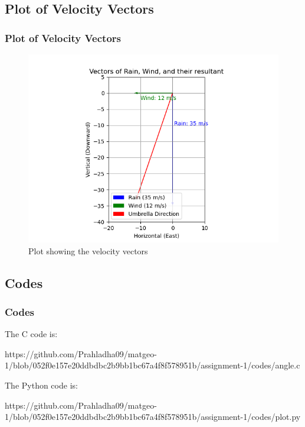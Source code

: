 \documentclass{beamer}
\theoremstyle{remark}
\numberwithin{equation}{section}
\begin{document}
\subsection{Plot of Velocity Vectors}
\begin{frame}
\frametitle{Plot of Velocity Vectors}
\begin{figure}[h!]
   \centering
   \includegraphics[width=0.7\linewidth]{figs/figure1.png}
   \caption{Plot showing the velocity vectors}
   \label{stemplot}
\end{figure}
\end{frame}
\subsection{Codes}
\begin{frame}
\frametitle{Codes}
The C code is:\\
 {\footnotesize
\begin{url}
https://github.com/Prahladha09/matgeo-1/blob/052f0e157e20ddbdbc2b9bb1bc67a4f8f578951b/assignment-1/codes/angle.c
\end{url}
}
The Python code is:\\
 {\footnotesize
\begin{url}
https://github.com/Prahladha09/matgeo-1/blob/052f0e157e20ddbdbc2b9bb1bc67a4f8f578951b/assignment-1/codes/plot.py
\end{url}
}
\end{frame}
\end{document}
